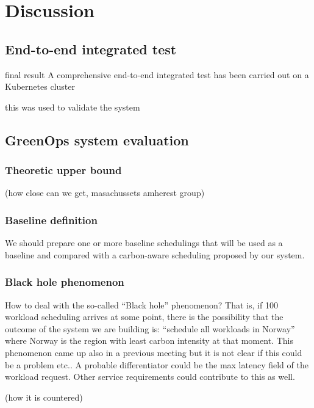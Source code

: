 \chapter{Discussion}
\label{cha:discussion}

\section{End-to-end integrated test}

final result
A comprehensive end-to-end integrated test has been carried out on a Kubernetes cluster

this was used to validate the system


\section{GreenOps system evaluation}

\subsection{Theoretic upper bound}

 (how close can we get, masachussets amherest group)

\subsection{Baseline definition}

We should prepare one or more baseline schedulings that will be used as a baseline and compared with a carbon-aware scheduling proposed by our system.

\subsection{Black hole phenomenon}

How to deal with the so-called “Black hole” phenomenon?
That is, if 100 workload scheduling arrives at some point, there is the possibility that the outcome of the system we are building is: “schedule all workloads in Norway” where Norway is the region with least carbon intensity at that moment.
This phenomenon came up also in a previous meeting but it is not clear if this could be a problem etc..
A probable differentiator could be the max latency field of the workload request. Other service requirements could contribute to this as well.


(how it is countered)

